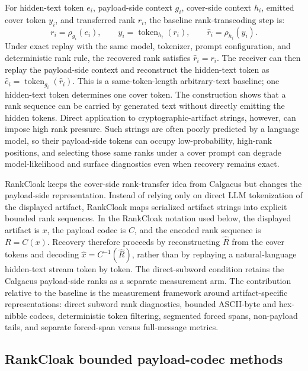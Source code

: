 \documentclass[fleqn,10pt]{wlscirep}
\begin{document}
For hidden-text token \(e_i\), payload-side context \(g_i\), cover-side context \(h_i\), emitted cover token \(y_i\), and transferred rank \(r_i\), the baseline rank-transcoding step is:
\begin{equation}
r_i=\rho_{g_i}(e_i),
\qquad
y_i=\operatorname{token}_{h_i}(r_i),
\qquad
\hat r_i=\rho_{h_i}(y_i).
\label{eq:calgacus-rank-transcoding}
\end{equation}
Under exact replay with the same model, tokenizer, prompt configuration, and deterministic rank rule, the recovered rank satisfies \(\hat r_i=r_i\). The receiver can then replay the payload-side context and reconstruct the hidden-text token as \(\hat e_i=\operatorname{token}_{g_i}(\hat r_i)\). This is a same-token-length arbitrary-text baseline; one hidden-text token determines one cover token. The construction shows that a rank sequence can be carried by generated text without directly emitting the hidden tokens. Direct application to cryptographic-artifact strings, however, can impose high rank pressure. Such strings are often poorly predicted by a language model, so their payload-side tokens can occupy low-probability, high-rank positions, and selecting those same ranks under a cover prompt can degrade model-likelihood and surface diagnostics even when recovery remains exact.

RankCloak keeps the cover-side rank-transfer idea from Calgacus but changes the payload-side representation. Instead of relying only on direct LLM tokenization of the displayed artifact, RankCloak maps serialized artifact strings into explicit bounded rank sequences. In the RankCloak notation used below, the displayed artifact is \(x\), the payload codec is \(C\), and the encoded rank sequence is \(R=C(x)\). Recovery therefore proceeds by reconstructing \(\hat R\) from the cover tokens and decoding \(\hat{x}=C^{-1}(\hat R)\), rather than by replaying a natural-language hidden-text stream token by token. The direct-subword condition retains the Calgacus payload-side ranks as a separate measurement arm. The contribution relative to the baseline is the measurement framework around artifact-specific representations: direct subword rank diagnostics, bounded ASCII-byte and hex-nibble codecs, deterministic token filtering, segmented forced spans, non-payload tails, and separate forced-span versus full-message metrics.

\subsection*{RankCloak bounded payload-codec methods}\label{sec:payload-method}
\end{document}
